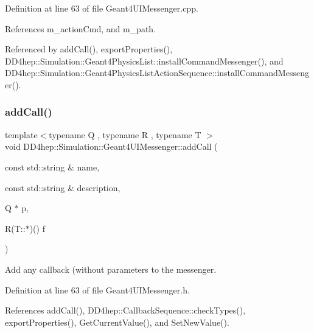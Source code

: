 Definition at line 63 of file Geant4\+U\+I\+Messenger.\+cpp.



References m\+\_\+action\+Cmd, and m\+\_\+path.



Referenced by add\+Call(), export\+Properties(), D\+D4hep\+::\+Simulation\+::\+Geant4\+Physics\+List\+::install\+Command\+Messenger(), and D\+D4hep\+::\+Simulation\+::\+Geant4\+Physics\+List\+Action\+Sequence\+::install\+Command\+Messenger().

\hypertarget{class_d_d4hep_1_1_simulation_1_1_geant4_u_i_messenger_a7c29eaaa89608d731289053ef12d2657}{}\label{class_d_d4hep_1_1_simulation_1_1_geant4_u_i_messenger_a7c29eaaa89608d731289053ef12d2657} 
\subsubsection{\texorpdfstring{add\+Call()}{addCall()}\hspace{0.1cm}{\footnotesize\ttfamily [2/2]}}
{\footnotesize\ttfamily template$<$typename Q , typename R , typename T $>$ \\
void D\+D4hep\+::\+Simulation\+::\+Geant4\+U\+I\+Messenger\+::add\+Call (\begin{DoxyParamCaption}\item[{const std\+::string \&}]{name,  }\item[{const std\+::string \&}]{description,  }\item[{Q $\ast$}]{p,  }\item[{R(T\+::$\ast$)()}]{f }\end{DoxyParamCaption})\hspace{0.3cm}{\ttfamily [inline]}}



Add any callback (without parameters to the messenger. 



Definition at line 63 of file Geant4\+U\+I\+Messenger.\+h.



References add\+Call(), D\+D4hep\+::\+Callback\+Sequence\+::check\+Types(), export\+Properties(), Get\+Current\+Value(), and Set\+New\+Value().

\hypertarget{class_d_d4hep_1_1_simulation_1_1_geant4_u_i_messenger_accdcb3b4978b3ed83c400ca7e6ced993}{}\label{class_d_d4hep_1_1_simulation_1_1_geant4_u_i_messenger_accdcb3b4978b3ed83c400ca7e6ced993} 
